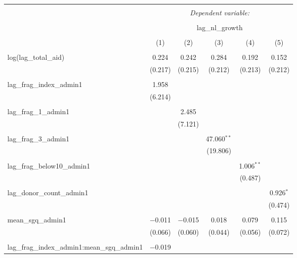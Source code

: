 
\begin{table}[!htbp] \centering 
  \caption{} 
  \label{} 
\begin{tabular}{@{\extracolsep{5pt}}lccccc} 
\\[-1.8ex]\hline 
\hline \\[-1.8ex] 
 & \multicolumn{5}{c}{\textit{Dependent variable:}} \\ 
\cline{2-6} 
\\[-1.8ex] & \multicolumn{5}{c}{lag\_nl\_growth} \\ 
\\[-1.8ex] & (1) & (2) & (3) & (4) & (5)\\ 
\hline \\[-1.8ex] 
 log(lag\_total\_aid) & 0.224 & 0.242 & 0.284 & 0.192 & 0.152 \\ 
  & (0.217) & (0.215) & (0.212) & (0.213) & (0.212) \\ 
  & & & & & \\ 
 lag\_frag\_index\_admin1 & 1.958 &  &  &  &  \\ 
  & (6.214) &  &  &  &  \\ 
  & & & & & \\ 
 lag\_frag\_1\_admin1 &  & 2.485 &  &  &  \\ 
  &  & (7.121) &  &  &  \\ 
  & & & & & \\ 
 lag\_frag\_3\_admin1 &  &  & 47.060$^{**}$ &  &  \\ 
  &  &  & (19.806) &  &  \\ 
  & & & & & \\ 
 lag\_frag\_below10\_admin1 &  &  &  & 1.006$^{**}$ &  \\ 
  &  &  &  & (0.487) &  \\ 
  & & & & & \\ 
 lag\_donor\_count\_admin1 &  &  &  &  & 0.926$^{*}$ \\ 
  &  &  &  &  & (0.474) \\ 
  & & & & & \\ 
 mean\_sgq\_admin1 & $-$0.011 & $-$0.015 & 0.018 & 0.079 & 0.115 \\ 
  & (0.066) & (0.060) & (0.044) & (0.056) & (0.072) \\ 
  & & & & & \\ 
 lag\_frag\_index\_admin1:mean\_sgq\_admin1 & $-$0.019 &  &  &  &  \\ 

\end{tabular}
\end{table}
